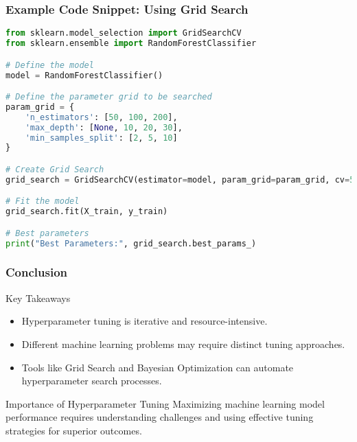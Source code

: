 \documentclass[aspectratio=169]{beamer}
\begin{document}
\begin{frame}[fragile]
    \frametitle{Example Code Snippet: Using Grid Search}
    \begin{lstlisting}[language=Python]
from sklearn.model_selection import GridSearchCV
from sklearn.ensemble import RandomForestClassifier

# Define the model
model = RandomForestClassifier()

# Define the parameter grid to be searched
param_grid = {
    'n_estimators': [50, 100, 200],
    'max_depth': [None, 10, 20, 30],
    'min_samples_split': [2, 5, 10]
}

# Create Grid Search
grid_search = GridSearchCV(estimator=model, param_grid=param_grid, cv=5)

# Fit the model
grid_search.fit(X_train, y_train)

# Best parameters
print("Best Parameters:", grid_search.best_params_)
    \end{lstlisting}
\end{frame}

\begin{frame}
    \frametitle{Conclusion}
    \begin{block}{Key Takeaways}
        \begin{itemize}
            \item Hyperparameter tuning is iterative and resource-intensive.
            \item Different machine learning problems may require distinct tuning approaches.
            \item Tools like Grid Search and Bayesian Optimization can automate hyperparameter search processes.
        \end{itemize}
    \end{block}
    
    \begin{block}{Importance of Hyperparameter Tuning}
        Maximizing machine learning model performance requires understanding challenges and using effective tuning strategies for superior outcomes.
    \end{block}
\end{frame}
\end{document}
